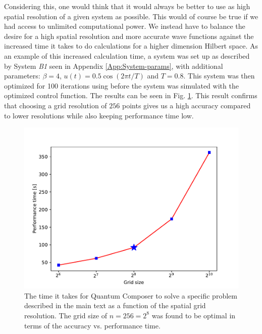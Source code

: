 \documentclass[a4paper, twocolumn]{revtex4-1}
\begin{document}
Considering this, one would think that it would always be better to use as high spatial resolution of a given system as possible. This would of course be true if we had access to unlimited computational power. We instead have to balance the desire for a high spatial resolution and more accurate wave functions against the increased time it takes to do calculations for a higher dimension Hilbert space. As an example of this increased calculation time, a system was set up as described by System \textit{B1} seen in Appendix \ref{App:System-params}, with additional parameters: $\beta = 4$, $u(t)=0.5 \cos(2\pi t/T)$ and $T=0.8$. This system was then optimized for 100 iterations using  before the system was simulated with the optimized control function. The results can be seen in Fig. \ref{fig:performanceTime}. This result confirms that choosing a grid resolution of $256$ points gives us a high accuracy compared to lower resolutions while also keeping performance time low.

\begin{figure}
	\includegraphics[width=\columnwidth]{graphics/stateAnalysis/PerformanceTime.pdf}
	\caption{The time it takes for Quantum Composer to solve a specific problem described in the main text as a function of the spatial grid resolution. The grid size of $n=256=2^8$ was found to be optimal in terms of the accuracy vs. performance time.}
	\label{fig:performanceTime}
\end{figure}
\end{document}
